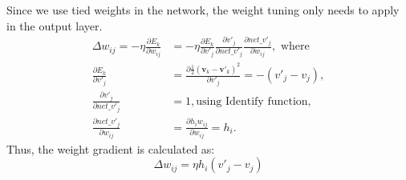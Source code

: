 Since we use tied weights in the network, the weight tuning only needs to apply in the output layer.
\begin{equation}
\begin{aligned}
\Delta w_{ij} = -\eta \frac{\partial E_k}{\partial w_{ij}} &= -\eta \frac{\partial E_k}{\partial v'_j} \frac{\partial v'_j}{\partial net\_v'_j} \frac{\partial net\_v'_j}{\partial w_{ij}}, \textrm{ where} \\
\frac{\partial E_k}{\partial v'_j} &= \frac{\partial \frac{1}{2}(\mathbf{v}_k - \mathbf{v'}_k)^2}{\partial v'_j}= -(v'_j - v_j), \\
\frac{\partial v'_j}{\partial net\_v'_j} &= 1, \textrm{using Identify function,}\\
\frac{\partial net\_v'_j}{\partial w_{ij}} &= \frac{\partial h_i w_{ij}}{\partial w_{ij}} = h_i.
\end{aligned}
\end{equation}
Thus, the weight gradient is calculated as:
\begin{equation}
\Delta w_{ij} = \eta h_i(v'_j - v_j)
\end{equation}

